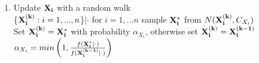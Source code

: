\documentclass[handout]{beamer}\usepackage[]{graphicx}\usepackage[]{color}
\begin{document}
\begin{frame}
\begin{enumerate}
 

\item
Update ${\bf X_i}$ with a random walk \\
\{${\bf X_i^{(k)}}:i=1,...,n $\}$|\cdot$ for $i=1,...n$ sample ${\bf X_i^*}$ from $N({\bf X_i^{(k)}},C_{X_i})$ \\
Set ${\bf X_i^{(k)}} = {\bf X_i^*}$ with probability $\alpha_{X_i}$, otherwise set ${\bf X_i^{(k)}} = {\bf X_i^{(k-1)}}$ \\

$\alpha_{X_i} = min\left(1, \frac{f({\bf X_i^*}|\cdot)}{f({\bf X_i^{(k-1)}}|\cdot)}  \right)$ \\

\end{enumerate}
\end{frame}
\end{document}
